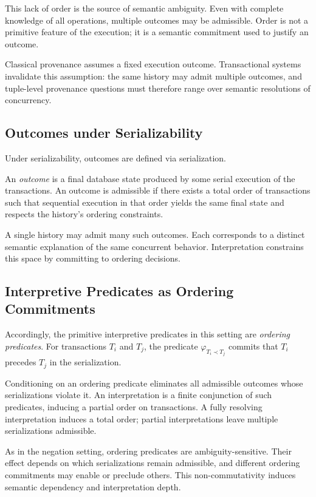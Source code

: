 \documentclass[acmsmall,nonacm]{acmart}
\theoremstyle{remark}
\numberwithin{definition}{section}
\numberwithin{theorem}{section}
\numberwithin{lemma}{section}
\numberwithin{corollary}{section}
\numberwithin{remark}{section}
\numberwithin{example}{section}
\numberwithin{observation}{section}
\numberwithin{assumption}{section}
\begin{document}
This lack of order is the source of semantic ambiguity.
Even with complete knowledge of all operations, multiple outcomes may be
admissible.
Order is not a primitive feature of the execution; it is a semantic commitment
used to justify an outcome.

Classical provenance assumes a fixed execution outcome.
Transactional systems invalidate this assumption: the same history may admit
multiple outcomes, and tuple-level provenance questions must therefore range over
semantic resolutions of concurrency.

\subsection{Outcomes under Serializability}

Under serializability, outcomes are defined via serialization.

An \emph{outcome} is a final database state produced by some serial execution of
the transactions.
An outcome is admissible if there exists a total order of transactions such that
sequential execution in that order yields the same final state and respects the
history’s ordering constraints.

A single history may admit many such outcomes.
Each corresponds to a distinct semantic explanation of the same concurrent
behavior.
Interpretation constrains this space by committing to ordering decisions.

\subsection{Interpretive Predicates as Ordering Commitments}

Accordingly, the primitive interpretive predicates in this setting are
\emph{ordering predicates}.
For transactions $T_i$ and $T_j$, the predicate
$\varphi_{T_i \prec T_j}$ commits that $T_i$ precedes $T_j$ in the serialization.

Conditioning on an ordering predicate eliminates all admissible outcomes whose
serializations violate it.
An interpretation is a finite conjunction of such predicates, inducing a partial
order on transactions.
A fully resolving interpretation induces a total order; partial interpretations
leave multiple serializations admissible.

As in the negation setting, ordering predicates are ambiguity-sensitive.
Their effect depends on which serializations remain admissible, and different
ordering commitments may enable or preclude others.
This non-commutativity induces semantic dependency and interpretation depth.
\end{document}
